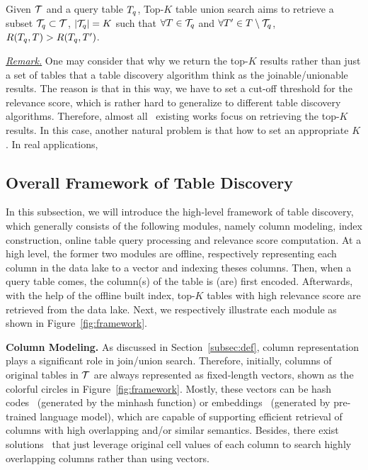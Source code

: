 \begin{definition}
	Given $\mathcal{T}$ and a query table $T_q$, Top-$K$ table union search aims to retrieve a subset $\mathcal{T}_q \subset \mathcal{T}$, $|\mathcal{T}_q|=K$ such that $\forall T \in \mathcal{T}_q$ and $\forall T' \in T \setminus \mathcal{T}_q$, $R(T_q, T)>R(T_q, T')$.
\end{definition}


\noindent \underline{\textit{Remark.}} One may consider that why we return the top-$K$ results rather than just  a set of  tables that a table discovery algorithm think as the joinable/unionable results.
The reason is that in this way, we have to set a cut-off threshold for the relevance score, which is rather hard to generalize to different table discovery algorithms. Therefore, almost all~\cite{} existing works focus on retrieving the top-$K$ results.  In this case, another natural problem is that how to set an appropriate $K$. In real applications, 

\subsection{Overall Framework of Table Discovery}

In this subsection, we will introduce the high-level framework of table discovery, which generally consists of the following modules, namely column modeling, index construction, online table query processing and relevance score computation.
At a high level, the former two modules are offline, \ie respectively representing each column in the data lake to a vector and indexing theses columns. Then, when a query table comes, the column(s) of the table is (are) first encoded. Afterwards, with the help of the offline built index, top-$K$ tables with high relevance score are retrieved from the data lake. Next, we respectively illustrate each module as shown in Figure~\ref{fig:framework}.



\noindent\textbf{Column Modeling.}
As discussed in Section~\ref{subsec:def},  column representation plays a significant role in join/union search. Therefore,  initially,  columns of  original tables in $\mathcal{T}$ are always represented as fixed-length vectors, shown as the colorful circles in Figure~\ref{fig:framework}.
Mostly,  these vectors can be hash codes~\cite{} (\eg generated by the minhash function) or embeddings~\cite{} (\eg generated by pre-trained language model), which are capable of supporting efficient retrieval of columns with high overlapping and/or similar semantics. Besides, there exist solutions~\cite{} that just leverage original cell values of each column to search highly overlapping columns rather than using vectors. 

